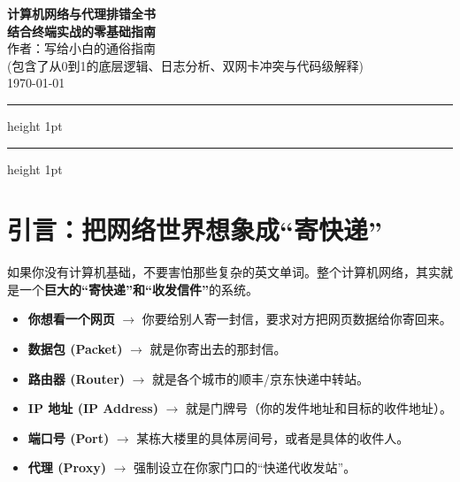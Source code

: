 \documentclass[12pt,a4paper]{ctexart}
\begin{document}
\begin{center}
    \vspace*{0.5cm}
    {\Huge \textbf{\color{blue!80!black}计算机网络与代理排错全书}}\\[0.8cm]
    {\LARGE \textbf{结合终端实战的零基础指南}}\\[0.5cm]
    {\large 作者：写给小白的通俗指南}\\[0.2cm]
    {\small (包含了从0到1的底层逻辑、日志分析、双网卡冲突与代码级解释)}\\[0.5cm]
    {\normalsize \today}
    \vspace*{0.8cm}
    \hrule height 1pt
    \vspace*{0.5cm}
\end{center}

\renewcommand{\contentsname}{\centering \Large 目录}
\setlength{\cftbeforesecskip}{0.3em}
\tableofcontents

\vspace{1cm}
\hrule height 1pt
\vspace{1cm}

\section{引言：把网络世界想象成“寄快递”}

如果你没有计算机基础，不要害怕那些复杂的英文单词。整个计算机网络，其实就是一个\textbf{巨大的“寄快递”和“收发信件”}的系统。

\begin{tcolorbox}[colback=blue!5,colframe=blue!75!black,title=概念对照表,fonttitle=\bfseries,boxrule=0.5pt,arc=3mm]
\begin{itemize}
    \item \textbf{你想看一个网页} $\rightarrow$ 你要给别人寄一封信，要求对方把网页数据给你寄回来。
    \item \textbf{数据包 (Packet)} $\rightarrow$ 就是你寄出去的那封信。
    \item \textbf{路由器 (Router)} $\rightarrow$ 就是各个城市的顺丰/京东快递中转站。
    \item \textbf{IP 地址 (IP Address)} $\rightarrow$ 就是门牌号（你的发件地址和目标的收件地址）。
    \item \textbf{端口号 (Port)} $\rightarrow$ 某栋大楼里的具体房间号，或者是具体的收件人。
    \item \textbf{代理 (Proxy)} $\rightarrow$ 强制设立在你家门口的“快递代收发站”。
\end{itemize}
\end{tcolorbox}
\end{document}
